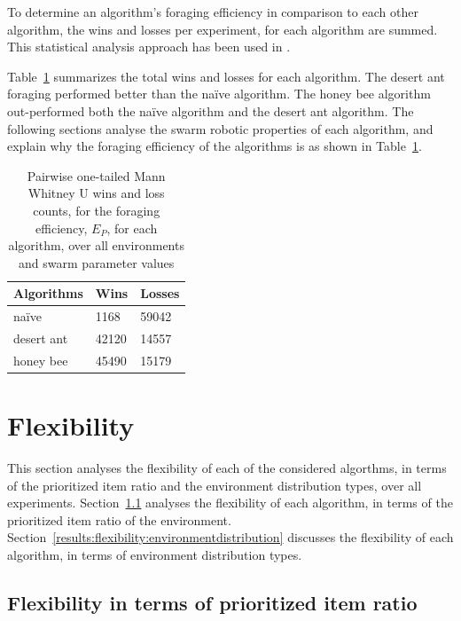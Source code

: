To determine an algorithm's foraging efficiency in comparison to each other algorithm, the wins and losses per experiment, for each algorithm are summed. This statistical analysis approach has been used in \cite{helbig2013performance}. 

Table~\ref{summarytable} summarizes the total wins and losses for each algorithm. The desert ant foraging performed better than the na\"ive algorithm. The honey bee algorithm out-performed both the na\"ive algorithm and the desert ant algorithm. The following sections analyse the swarm robotic properties of each algorithm, and explain why the foraging efficiency of the algorithms is as shown in Table~\ref{summarytable}.


\begin{table}[]
\centering
\caption{Pairwise one-tailed Mann Whitney U wins and loss counts, for the foraging efficiency, $E_P$, for each algorithm, over all environments and swarm parameter values }
\label{summarytable}
\begin{tabular}{@{}lll@{}}
\toprule
\textbf{Algorithms} & \textbf{Wins} & \textbf{Losses} \\ \midrule
na\"ive               & 1168          & 59042           \\
desert ant          & 42120         & 14557           \\
honey bee           & 45490         & 15179           \\ \bottomrule
\end{tabular}
\end{table}

\section{Flexibility}
\label{results:flexibility}

This section analyses the flexibility of each of the considered algorthms, in terms of the prioritized item ratio and the environment distribution types, over all experiments. Section~\ref{results:prioritizeditemratio} analyses the flexibility of each algorithm, in terms of the prioritized item ratio of the environment. Section~\ref{results:flexibility:environmentdistribution} discusses the flexibility of each algorithm, in terms of environment distribution types.
\subsection{Flexibility in terms of prioritized item ratio}
\label{results:prioritizeditemratio}

